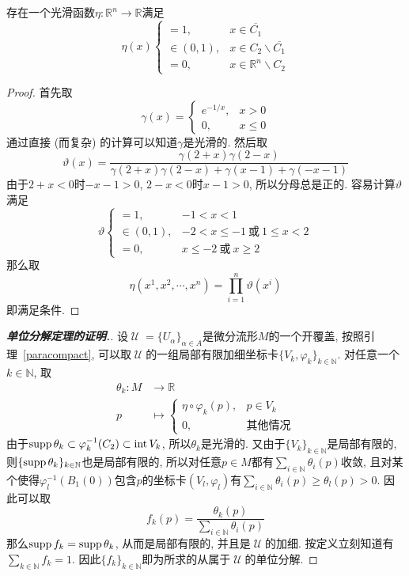 \begin{lem}\label{urysohn}
    存在一个光滑函数$\eta:\mathbb{R}^n\to\mathbb{R}$满足
    \[\eta(x)\begin{cases}
        =1, & x\in \overline{C_1}\\
        \in(0,1), & x\in C_2\backslash\overline{C_1}\\
        =0, & x\in\mathbb{R}^n\backslash C_2
    \end{cases}\]
\end{lem}

\begin{proof}
    首先取
    \[\gamma(x)=\begin{cases}
        e^{-1/x}, & x>0\\
        0, & x\leq 0
    \end{cases}\]
    通过直接 (而复杂) 的计算可以知道$\gamma$是光滑的.
    然后取
    \[\vartheta(x)=\frac{\gamma(2+x)\gamma(2-x)}{\gamma(2+x)\gamma(2-x)+\gamma(x-1)+\gamma(-x-1)}\]
    由于$2+x<0$时$-x-1>0$, $2-x<0$时$x-1>0$, 所以分母总是正的.
    容易计算$\vartheta$满足
    \[\vartheta\begin{cases}
        =1, & -1<x<1\\
        \in(0,1), & -2<x\leq -1\ \text{或}\ 1\leq x<2\\
        =0, & x\leq -2\ \text{或}\ x\geq 2
    \end{cases}\]
    那么取
    \[\eta(x^1,x^2,\cdots,x^n)=\prod_{i=1}^n\vartheta(x^i)\]
    即满足条件.
\end{proof}

\begin{proof}[{\bf 单位分解定理的证明.}]
    设$\mscrU=\{U_\alpha\}_{\alpha\in A}$是微分流形$M$的一个开覆盖, 按照引理~\ref{paracompact}, 可以取$\mscrU$的一组局部有限加细坐标卡$\{V_k,\varphi_k\}_{k\in\mathbb{N}}$.
    对任意一个$k\in\mathbb{N}$, 取
    \begin{align*}
        \theta_k:M&\to\mathbb{R}\\
        p&\mapsto\left\{\begin{array}{ll}
            \eta\circ\varphi_k(p), & p\in V_k\\
            0, & \text{其他情况}
        \end{array}\right.
    \end{align*}
    由于$\operatorname{supp}{\theta_k}\subset\varphi_k^{-1}(C_2)\subset\operatorname{int} V_k$, 所以$\theta_k$是光滑的.
    又由于$\{V_k\}_{k\in\mathbb{N}}$是局部有限的, 则$\{\operatorname{supp}{\theta_k}\}_{k\in\mathbb{N}}$也是局部有限的, 所以对任意$p\in M$都有$\displaystyle\sum_{i\in\mathbb{N}}\theta_i(p)$收敛, 且对某个使得$\varphi_l^{-1}(B_1(0))$包含$p$的坐标卡$(V_l,\varphi_l)$有$\displaystyle\sum_{i\in\mathbb{N}}\theta_i(p)\geq\theta_l(p)>0$.
    因此可以取
    \[f_k(p)=\frac{\theta_k(p)}{\sum_{i\in\mathbb{N}}\theta_i(p)}\]
    那么$\operatorname{supp}{f_k}=\operatorname{supp}\theta_k$, 从而是局部有限的, 并且是$\mscrU$的加细.
    按定义立刻知道有$\displaystyle\sum_{k\in\mathbb{N}}f_k=1$.
    因此$\{f_k\}_{k\in\mathbb{N}}$即为所求的从属于$\mscrU$的单位分解.
\end{proof}

